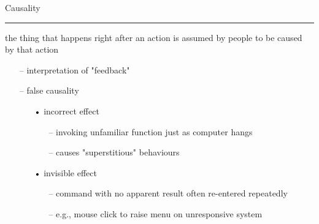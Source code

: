 \documentclass[pdf]{beamer}
\begin{document}
\begin{frame}
{Causality}{\textcolor{red}{\rule{12cm}{1.2pt}}}

the thing that happens right after an action is assumed by people to be caused by that action
 \begin{itemize}
      \item [--]interpretation of "feedback"
 \end{itemize}
 \begin{itemize}
      \item [--]false causality
      \begin{itemize}
     		\item[\textcolor{black}{•}]incorrect effect
         		\begin{itemize}
         			\item [--]invoking unfamiliar function just as computer hangs
				\end{itemize}
                \begin{itemize}
                	\item [--]causes "superstitious" behaviours
                \end{itemize}
      		\end{itemize}
      \begin{itemize}
      		\item[\textcolor{black}{•}]invisible effect
         		\begin{itemize}
         			\item [--]command with no apparent result often re-entered repeatedly
				\end{itemize}
                \begin{itemize}
                	\item [--]e.g., mouse click to raise menu on unresponsive system
		        \end{itemize}
 	 \end{itemize}
\end{itemize}
\end{frame}



\end{document}

